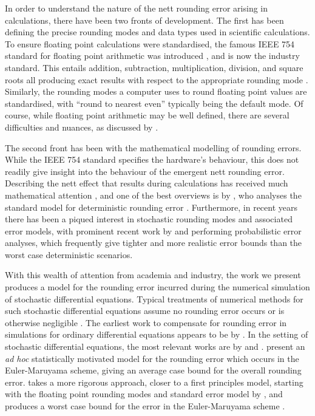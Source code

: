 \documentclass[manuscript,review]{acmart}
\begin{document}
In order to understand the nature of the nett rounding error arising in calculations, there have been two fronts of development. The first has been defining the precise rounding modes and data types used in scientific calculations. To ensure floating point calculations were standardised, the famous IEEE 754 standard for floating point arithmetic was introduced \citep{ieee1985ieee}, and is now the industry standard. This entails addition, subtraction, multiplication, division, and square roots all producing exact results with respect to the appropriate rounding mode \citep[page~15]{tucker2011validated}. Similarly, the rounding modes a computer uses to round floating point values are standardised, with ``round to nearest even'' typically being the default mode. Of course, while floating point arithmetic may be well defined, there are several difficulties and nuances, as discussed by \citet{goldberg1991every}.

The second front has been with the mathematical modelling of rounding errors. While the IEEE 754 standard specifies the hardware's behaviour, this does not readily give insight into the behaviour of the emergent nett rounding error. Describing the nett effect that results during calculations has received much mathematical attention \citep{higham2002accuracy,wilkinson1961error,wilkinson1974numerical,wilkinson1986error,hull1966tests}, and one of the best overviews is by \citet{higham2002accuracy}, who analyses the standard model for deterministic rounding error \citep[2.2, (2.4)]{higham2002accuracy}. Furthermore, in recent years there has been a piqued interest in stochastic rounding modes and associated error models, with prominent recent work by \citet{higham2019new} and \citet{ipsen2019probabilistic} performing probabilistic error analyses, which frequently give tighter and more realistic error bounds than the worst case deterministic scenarios.  

With this wealth of attention from academia and industry, the work we present produces a model for the rounding error incurred during the numerical simulation of stochastic differential equations. Typical treatments of numerical methods for such stochastic differential equations assume no rounding error occurs or is otherwise negligible \citep[9.3, page~316]{kloeden1999numerical} \citep{glasserman2013monte}. The earliest work to compensate for rounding error in simulations for ordinary differential equations appears to be by \citet{vitasek1969numerical}. In the setting of stochastic differential equations, the most relevant works are by \citet{arciniega2003rounding} and \citet{omland2016mixed}. \citet{arciniega2003rounding} present an \textit{ad hoc} statistically motivated model for the rounding error which occurs in the Euler-Maruyama scheme, giving an average case bound for the overall rounding error. \citet{omland2016mixed} takes a more rigorous approach, closer to a first principles model, starting with the floating point rounding modes and standard error model by \citet{higham2002accuracy}, and produces a worst case bound for the error in the Euler-Maruyama scheme \citep[theorem~4.8]{omland2016mixed}. 
\end{document}
